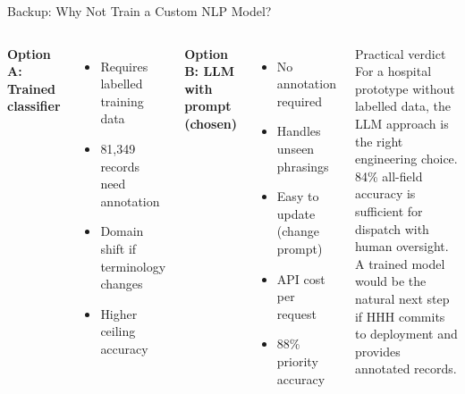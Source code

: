 \documentclass[aspectratio=169,14pt]{beamer}
\newcommand{\tick}{\textcolor{okgreen}{\textbf{\checkmark}}}
\newcommand{\cross}{\textcolor{alertred}{\textbf{\texttimes}}}
\begin{document}
\begin{frame}{Backup: Why Not Train a Custom NLP Model?}
\begin{columns}
\textbf{Option A: Trained classifier}
\begin{itemize}
  \item[\cross] Requires labelled training data
  \item[\cross] 81,349 records need annotation
  \item[\cross] Domain shift if terminology changes
  \item[\tick] Higher ceiling accuracy
\end{itemize}

\vspace{0.4cm}
\textbf{Option B: LLM with prompt (chosen)}
\begin{itemize}
  \item[\tick] No annotation required
  \item[\tick] Handles unseen phrasings
  \item[\tick] Easy to update (change prompt)
  \item[\cross] API cost per request
  \item[\cross] 88\% priority accuracy
\end{itemize}

\begin{exampleblock}{Practical verdict}
  For a hospital prototype without labelled data, the LLM approach is the right engineering choice. 84\% all-field accuracy is sufficient for dispatch with human oversight.\\[0.3cm]
  A trained model would be the natural next step if HHH commits to deployment and provides annotated records.
\end{exampleblock}
\end{columns}
\end{frame}
\end{document}
